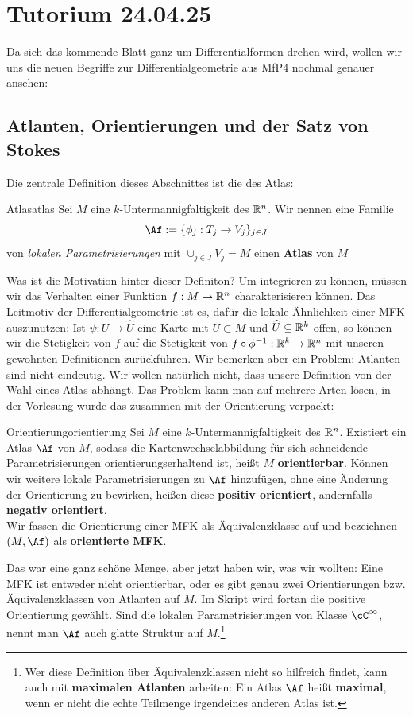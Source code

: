 \section{Tutorium 24.04.25}
\label{sec:24_04_25}
Da sich das kommende Blatt ganz um Differentialformen drehen wird, wollen wir uns die neuen Begriffe zur Differentialgeometrie aus MfP4 nochmal genauer ansehen:
\subsection{Atlanten, Orientierungen und der Satz von Stokes}
Die zentrale Definition dieses Abschnittes ist die des Atlas:
\begin{definition}{Atlas}{atlas}
Sei $M$ eine $k$-Untermannigfaltigkeit des $\mathbb{R}^n$. Wir nennen eine Familie
\begin{equation}
\Af := \{\phi_j: T_j \to V_j\}_{j \in J}
\end{equation}
von \textit{lokalen Parametrisierungen} mit $\cup_{j \in J} V_j =M$ einen \textbf{Atlas} von $M$
\end{definition}
Was ist die Motivation hinter dieser Definiton? Um integrieren zu können, müssen wir das Verhalten einer Funktion $f:M \to \mathbb{R}^n$ charakterisieren können. Das Leitmotiv der Differentialgeometrie ist es, dafür die lokale Ähnlichkeit einer MFK auszunutzen: Ist $\psi: U \to \widehat{U}$ eine Karte mit $U \subset M$ und $\widehat{U} \subseteq \mathbb{R}^k$ offen, so können wir die Stetigkeit von $f$ auf die Stetigkeit von $f \circ \phi^{-1}: \R^k \to \R^n$ mit unseren gewohnten Definitionen zurückführen. Wir bemerken aber ein Problem: Atlanten sind nicht eindeutig. Wir wollen natürlich nicht, dass unsere Definition von der Wahl eines Atlas abhängt. 
Das Problem kann man auf mehrere Arten lösen, in der Vorlesung wurde das zusammen mit der Orientierung verpackt:
\begin{definition}{Orientierung}{orientierung}
Sei $M$ eine $k$-Untermannigfaltigkeit des $\mathbb{R}^n$. Existiert ein Atlas $\Af$ von $M$, sodass die Kartenwechselabbildung für sich schneidende Parametrisierungen orientierungserhaltend ist, heißt $M$ \textbf{orientierbar}. Können wir weitere lokale Parametrisierungen zu $\Af$ hinzufügen, ohne eine Änderung der Orientierung zu bewirken, heißen diese \textbf{positiv orientiert}, andernfalls \textbf{negativ orientiert}.\\
Wir fassen die Orientierung einer MFK als Äquivalenzklasse auf und bezeichnen $(M,\Af)$ als \textbf{orientierte MFK}.
\end{definition}
Das war eine ganz schöne Menge, aber jetzt haben wir, was wir wollten: Eine MFK ist entweder nicht orientierbar, oder es gibt genau zwei Orientierungen bzw. Äquivalenzklassen von Atlanten auf $M$. Im Skript wird fortan die positive Orientierung gewählt. Sind die lokalen Parametrisierungen von Klasse $\cC^\infty$, nennt man $\Af$ auch glatte Struktur auf $M$.\footnote{Wer diese Definition über Äquivalenzklassen nicht so hilfreich findet, kann auch mit \textbf{maximalen Atlanten} arbeiten: Ein Atlas $\Af$ heißt \textbf{maximal}, wenn er nicht die echte Teilmenge irgendeines anderen Atlas ist.}\\
